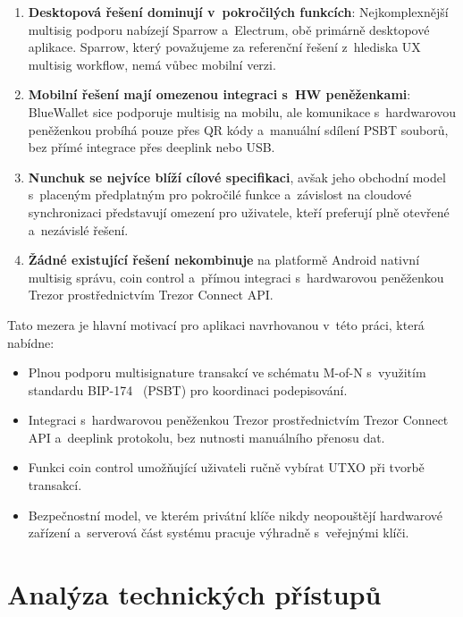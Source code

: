 \begin{enumerate}
  \item \textbf{Desktopová řešení dominují v~pokročilých funkcích}:
    Nejkomplexnější multisig podporu nabízejí Sparrow a~Electrum, obě primárně
    desktopové aplikace. Sparrow, který považujeme za referenční řešení
    z~hlediska UX multisig workflow, nemá vůbec mobilní verzi.

  \item \textbf{Mobilní řešení mají omezenou integraci s~HW peněženkami}:
    BlueWallet sice podporuje multisig na mobilu, ale komunikace s~hardwarovou
    peněženkou probíhá pouze přes QR kódy a~manuální sdílení PSBT souborů,
    bez přímé integrace přes deeplink nebo USB.

  \item \textbf{Nunchuk se nejvíce blíží cílové specifikaci}, avšak jeho
    obchodní model s~placeným předplatným pro pokročilé funkce a~závislost na
    cloudové synchronizaci představují omezení pro uživatele, kteří preferují
    plně otevřené a~nezávislé řešení.

  \item \textbf{Žádné existující řešení nekombinuje} na platformě Android
    nativní multisig správu, coin control a~přímou integraci s~hardwarovou
    peněženkou Trezor prostřednictvím Trezor Connect API.
\end{enumerate}

Tato mezera je hlavní motivací pro aplikaci navrhovanou v~této práci,
která nabídne:

\begin{itemize}
  \item Plnou podporu multisignature transakcí ve schématu M-of-N s~využitím
    standardu BIP-174~\cite{BIP174} (PSBT) pro koordinaci podepisování.
  \item Integraci s~hardwarovou peněženkou Trezor prostřednictvím Trezor
    Connect API a~deeplink protokolu, bez nutnosti manuálního přenosu dat.
  \item Funkci coin control umožňující uživateli ručně vybírat UTXO při tvorbě
    transakcí.
  \item Bezpečnostní model, ve kterém privátní klíče nikdy neopouštějí
    hardwarové zařízení a~serverová část systému pracuje výhradně
    s~veřejnými klíči.
\end{itemize}

\section{Analýza technických přístupů}
\label{sec:analyza-pristupu}

